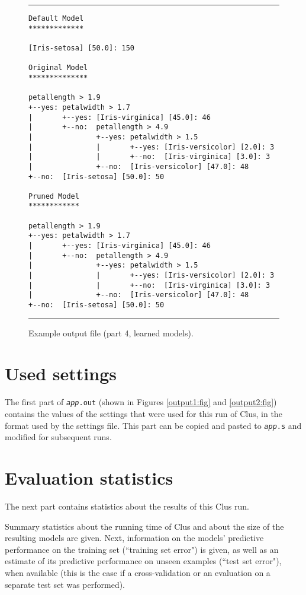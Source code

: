 \begin{figure}
\hrule
\begin{verbatim}
Default Model
*************

[Iris-setosa] [50.0]: 150

Original Model
**************

petallength > 1.9
+--yes: petalwidth > 1.7
|       +--yes: [Iris-virginica] [45.0]: 46
|       +--no:  petallength > 4.9
|               +--yes: petalwidth > 1.5
|               |       +--yes: [Iris-versicolor] [2.0]: 3
|               |       +--no:  [Iris-virginica] [3.0]: 3
|               +--no:  [Iris-versicolor] [47.0]: 48
+--no:  [Iris-setosa] [50.0]: 50

Pruned Model
************

petallength > 1.9
+--yes: petalwidth > 1.7
|       +--yes: [Iris-virginica] [45.0]: 46
|       +--no:  petallength > 4.9
|               +--yes: petalwidth > 1.5
|               |       +--yes: [Iris-versicolor] [2.0]: 3
|               |       +--no:  [Iris-virginica] [3.0]: 3
|               +--no:  [Iris-versicolor] [47.0]: 48
+--no:  [Iris-setosa] [50.0]: 50
\end{verbatim}
\hrule
\caption{Example output file (part 4, learned models).}
\label{output4:fig}
\end{figure}

\section{Used settings}

The first part of {\tt {\em app}.out} (shown in Figures \ref{output1:fig} and \ref{output2:fig}) contains the values of the settings that were used for this run of Clus, in the format used by the settings file.  This part can be copied and pasted to {\tt {\em app}.s} and modified for subsequent runs.

\section{Evaluation statistics}

The next part contains statistics about the results of this Clus run.

Summary statistics about the running time of Clus and about the size of the resulting models are given.  Next, information on the models' predictive performance on the training set (``training set error") is given, as well as an estimate of its predictive performance on unseen examples (``test set error"), when available (this is the case if a cross-validation or an evaluation on a separate test set was performed).  

